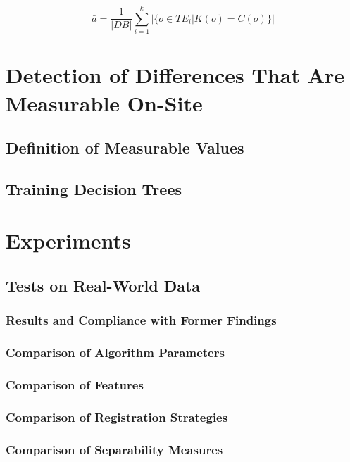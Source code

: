 \documentclass[pdftex,12pt,a4paper]{report}
\begin{document}
\begin{equation}
\bar{a} = \frac{1}{|DB|} \sum_{i=1}^k | \{o \in TE_i | K(o) = C(o) \}| 
\end{equation}



\chapter{Detection of Differences That Are Measurable On-Site}
\label{chapter:measurable-differences}

\section{Definition of Measurable Values}

\section{Training Decision Trees}

\chapter{Experiments}

\section{Tests on Real-World Data}

\subsection{Results and Compliance with Former Findings}

\subsection{Comparison of Algorithm Parameters}
\label{sub:comparisonalgorithmparameters}

\subsection{Comparison of Features}

\subsection{Comparison of Registration Strategies}

\subsection{Comparison of Separability Measures}
\end{document}
